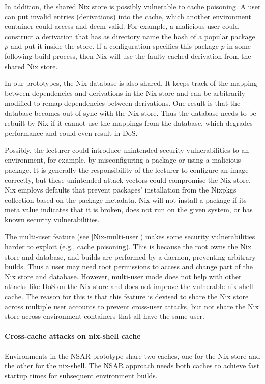 In addition, the shared Nix store is possibly vulnerable to cache poisoning. A user can put invalid entries (derivations) into the cache, which another environment container could access and deem valid. For example, a malicious user could construct a derivation that has as directory name the hash of a popular package $p$ and put it inside the store. If a configuration specifies this package $p$ in some following build process, then Nix will use the faulty cached derivation from the shared Nix store.

In our prototypes, the Nix database is also shared. It keeps track of the mapping between dependencies and derivations in the Nix store and can be arbitrarily modified to remap dependencies between derivations. One result is that the database becomes out of sync with the Nix store. Thus the database needs to be rebuilt by Nix if it cannot use the mappings from the database, which degrades performance and could even result in DoS. 

Possibly, the lecturer could introduce unintended security vulnerabilities to an environment, for example, by misconfiguring a package or using a malicious package. It is generally the responsibility of the lecturer to configure an image correctly, but these unintended attack vectors could compromise the Nix store. Nix employs defaults that prevent packages’ installation from the Nixpkgs collection based on the package metadata. Nix will not install a package if its meta value indicates that it is broken, does not run on the given system, or has known security vulnerabilities. 

The multi-user feature (see \ref{Nix-multi-user}) makes some security vulnerabilities harder to exploit (e.g., cache poisoning). This is because the root owns the Nix store and database, and builds are performed by a daemon, preventing arbitrary builds. Thus a user may need root permissions to access and change part of the Nix store and database. However, multi-user mode does not help with other attacks like DoS on the Nix store and does not improve the vulnerable nix-shell cache. The reason for this is that this feature is devised to share the Nix store across multiple user accounts to prevent cross-user attacks, but not share the Nix store across environment containers that all have the same user.
\paragraph{Cross-cache attacks on nix-shell cache}\label{cross-cache-attacks-on-nix-shell-cache}
Environments in the NSAR prototype share two caches, one for the Nix store and the other for the nix-shell. The NSAR approach needs both caches to achieve fast startup times for subsequent environment builds. 

